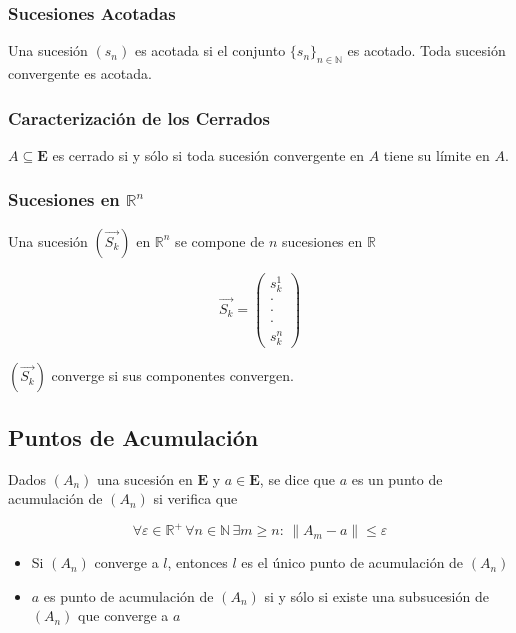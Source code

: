 \subsubsection{Sucesiones Acotadas}

Una sucesión $(s_n)$ es acotada si el conjunto $\{s_n\}_{n\in\mathbb{N}}$ es acotado. Toda sucesión convergente es acotada.

\subsubsection{Caracterización de los Cerrados}

$A\subseteq\mathbf{E}$ es cerrado si y sólo si toda sucesión convergente en $A$ tiene su límite en $A$.

\subsubsection{Sucesiones en $\mathbb{R}^n$}

Una sucesión $(\Vec{S_k})$ en $\mathbb{R}^n$ se compone de $n$ sucesiones en $\mathbb{R}$

\[\Vec{S_k}=\begin{pmatrix} s_k^1\\ \cdot\\ \cdot\\
\cdot\\ s_k^n\end{pmatrix}\]

$(\Vec{S_k})$ converge si sus componentes convergen.

\subsection{Puntos de Acumulación}

Dados $(A_n)$ una sucesión en $\mathbf{E}$ y $a\in\mathbf{E}$, se dice que $a$ es un punto de acumulación de $(A_n)$ si verifica que

\[\forall\varepsilon\in\mathbb{R}^+\,
\forall n\in\mathbb{N}\, \exists m\geq n:\,
\|A_m-a\|\leq \varepsilon\]

\begin{itemize}
    \item Si $(A_n)$ converge a $l$, entonces $l$ es el único punto de acumulación de $(A_n)$
    \item $a$ es punto de acumulación de $(A_n)$ si y sólo si existe una subsucesión de $(A_n)$ que converge a $a$
\end{itemize}


